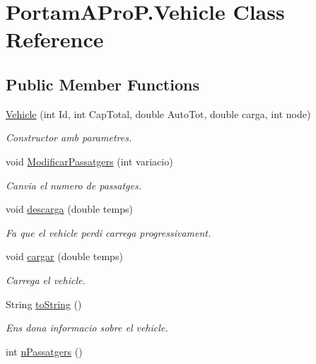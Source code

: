 \hypertarget{class_portam_a_pro_p_1_1_vehicle}{}\section{Portam\+A\+Pro\+P.\+Vehicle Class Reference}
\label{class_portam_a_pro_p_1_1_vehicle}
\subsection*{Public Member Functions}
\begin{DoxyCompactItemize}
\item 
\hyperlink{class_portam_a_pro_p_1_1_vehicle_aff6c27bb9be6a4463d74a003e1110b1b}{Vehicle} (int Id, int Cap\+Total, double Auto\+Tot, double carga, int node)
\begin{DoxyCompactList}\small\item\em Constructor amb parametres. \end{DoxyCompactList}\item 
void \hyperlink{class_portam_a_pro_p_1_1_vehicle_a0b870654a23dba4acdb2b8a9614a93d8}{Modificar\+Passatgers} (int variacio)
\begin{DoxyCompactList}\small\item\em Canvia el numero de passatges. \end{DoxyCompactList}\item 
void \hyperlink{class_portam_a_pro_p_1_1_vehicle_a2b871f64c384f8fb8ebde6d1ff0282b0}{descarga} (double temps)
\begin{DoxyCompactList}\small\item\em Fa que el vehicle perdi carrega progressivament. \end{DoxyCompactList}\item 
void \hyperlink{class_portam_a_pro_p_1_1_vehicle_ae39b60cb4d70ef1aef7ec97341eb25ce}{cargar} (double temps)
\begin{DoxyCompactList}\small\item\em Carrega el vehicle. \end{DoxyCompactList}\item 
String \hyperlink{class_portam_a_pro_p_1_1_vehicle_a54c396472460bc914c2cc65b64ab5a0b}{to\+String} ()
\begin{DoxyCompactList}\small\item\em Ens dona informacio sobre el vehicle. \end{DoxyCompactList}\item 
int \hyperlink{class_portam_a_pro_p_1_1_vehicle_acaee99f30ba494ed5bde824f283ca329}{n\+Passatgers} ()

\end{DoxyCompactItemize}
